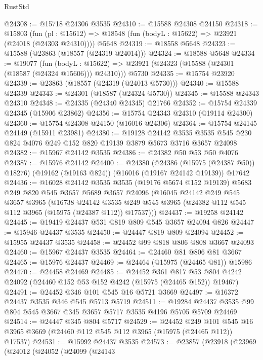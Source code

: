 \begin{lexlean}{RustStd}
\begin{coremodule}
@24308 := @15718 @24306 @3535
@24310 := @15588 @24308 @24150
@24318 := @15803
    (fun (pl : @15612) => @18548 (fun (bodyL : @15622) => @23921 (@24018 (@24303 @24310))))
    @5648
@24319 := @18558 @5648
@24323 := @15588 (@23863 (@18557 (@24319 @24014)))
@24324 := @18588 @5648
@24334 := @19077
    (fun (bodyL : @15622) => @23921 (@24323 (@15588 (@24301 (@18587 (@24324 @15606))) @24310)))
    @5730
@24335 := @15754 @23920
@24339 := @23863 (@18557 (@24319 (@24013 @5730)))
@24340 := @15588 @24339
@24343 := @24301 (@18587 (@24324 @5730))
@24345 := @15588 @24343 @24310
@24348 := @24335 (@24340 @24345) @21766
@24352 := @15754 @24339 @24345 (@15906 @23862)
@24356 := @15754 @24343 @24310 (@19114 @24300)
@24360 := @15754 @24308 @24150 (@16016 @24306)
@24364 := @15754 @24145 @24149 (@15911 @23981)
@24380 := @19128
    @24142
    @3535
    @3535
    @545
    @230
    @824
    @4076
    @249
    @152
    @820
    @19139
    @3879
    @5673
    @3716
    @3657
    @24098
@24382 := @15967 @24142 @3535
@24386 := @24382 @50 @53 @50 @4076
@24387 := @15976 @24142
@24400 := @24380
    (@24386 (@15975 (@24387 @50)) @18276)
    (@19162 (@19163 @824))
    (@16016 (@19167 @24142 @19139))
    @17642
@24436 := @16028
    @24142
    @3535
    @3535
    (@19176 @5674 @152 @19139)
    @5683
    @249
    @820
    @545
    @3657
    @5689
    @3657
    @24096
    (@16045
      @24142
      @249
      @545
      @3657
      @3965
      (@16738
        @24142
        @3535
        @249
        @545
        @3965
        (@24382 @112 @545 @112 @3965 (@15975 (@24387 @112)) @17537)))
@24437 := @19258 @24142
@24445 := @19419 @24437 @531 @819 @809 @545 @3657 @24094 @826
@24447 := @15946 @24437 @3535
@24450 := @24447 @819 @809 @24094
@24452 := @15955 @24437 @3535
@24458 := @24452 @99 @818 @806 @808 @3667 @24093
@24460 := @15967 @24437 @3535
@24464 := @24460 @81 @806 @81 @3667
@24465 := @15976 @24437
@24469 := @24464 (@15975 (@24465 @81)) @15986
@24470 := @24458 @24469
@24485 := @24452
    @361
    @817
    @53
    @804
    @4242
    @24092
    (@24460 @152 @53 @152 @4242 (@15975 (@24465 @152)) @19467)
@24491 := @24452 @346 @101 @545 @16 @5721 @3669
@24497 := @16372 @24437 @3535 @346 @545 @5713 @5719
@24511 := @19284 @24437 @3535 @99 @804 @545 @3667 @345 @3657 @5717 @3535 @4196 @5705 @5709 @24469
@24514 := @24447 @345 @804 @5717
@24529 := @24452
    @249
    @101
    @545
    @16
    @3965
    @3669
    (@24460 @112 @545 @112 @3965 (@15975 (@24465 @112)) @17537)
@24531 := @15992 @24437 @3535
@24573 := @23857
    (@23918
      (@23969
        (@24012
          (@24052
            (@24099
              (@24143

\end{coremodule}
\end{lexlean}
